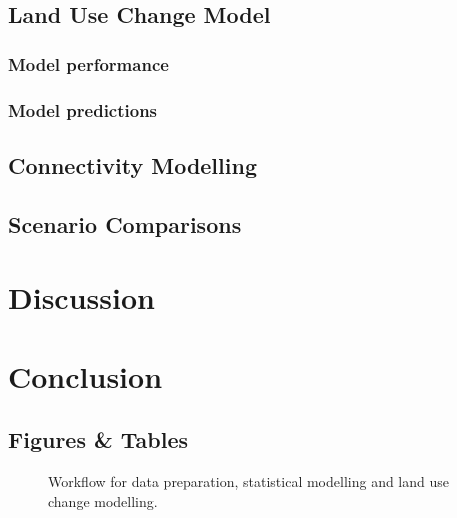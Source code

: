 \subsection{Land Use Change Model}

\subsubsection{Model performance}

\subsubsection{Model predictions}

\subsection{Connectivity Modelling}

\subsection{Scenario Comparisons}

\section{Discussion}

\section{Conclusion}


\newpage
\begin{center}
\section*{Figures \& Tables}
\end{center}


\begin{figure}[h]
\caption{Workflow for data preparation, statistical modelling and land use change modelling.}
\label{fig:workflow1}
\end{figure}
\clearpage

